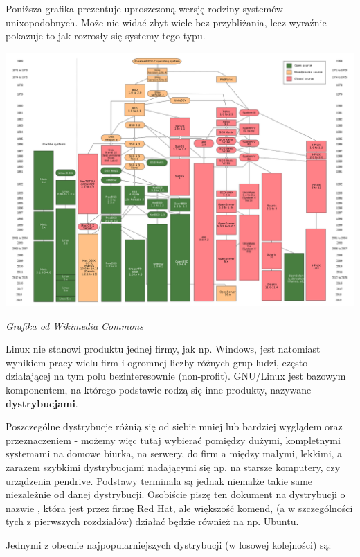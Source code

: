 \documentclass[12pt]{article}
\begin{document}
Poniższa grafika prezentuje uproszczoną wersję rodziny systemów unixopodobnych. Może nie widać zbyt wiele bez przybliżania, lecz wyraźnie pokazuje to jak rozrosły się systemy tego typu.

\begin{center}
    \includegraphics[scale=0.3]{Unix_history-simple.svg.png}

    \footnotesize
    \emph{Grafika od Wikimedia Commons}
    \normalsize
\end{center}

Linux nie stanowi produktu jednej firmy, jak np. Windows, jest natomiast wynikiem pracy wielu firm i ogromnej liczby różnych grup ludzi, często działającej na tym polu bezinteresownie (non-profit). GNU/Linux jest bazowym komponentem, na którego podstawie rodzą się inne produkty, nazywane \textbf{dystrybucjami}.

Poszczególne dystrybucje różnią się od siebie mniej lub bardziej wyglądem oraz przeznaczeniem - możemy więc tutaj wybierać pomiędzy dużymi, kompletnymi systemami na domowe biurka, na serwery, do firm a między małymi, lekkimi, a zarazem szybkimi dystrybucjami nadającymi się np. na starsze komputery, czy urządzenia pendrive. Podstawy terminala są jednak niemalże takie same niezależnie od danej dystrybucji. Osobiście piszę ten dokument na dystrybucji o nazwie , która  jest przez firmę Red Hat, ale większość komend, (a w szczególności tych z pierwszych rozdziałów) działać będzie również na np. Ubuntu.

Jednymi z obecnie najpopularniejszych dystrybucji (w losowej kolejności) są:
\end{document}
